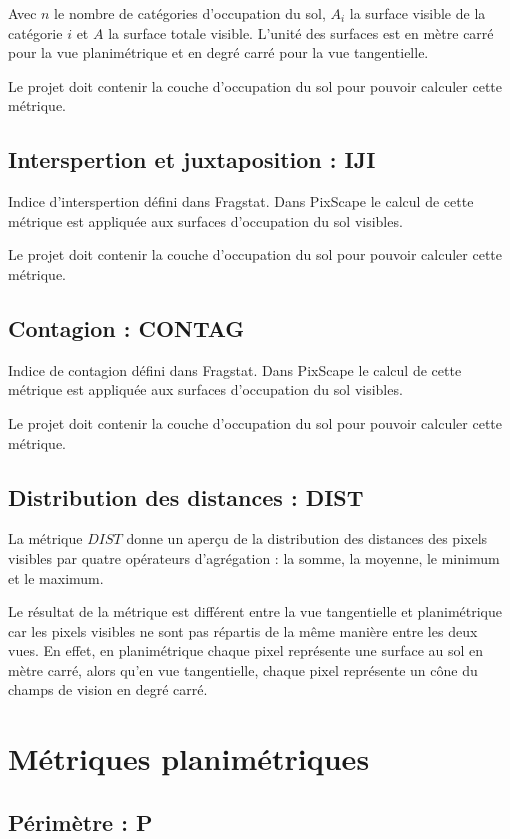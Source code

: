 \documentclass{report}
\begin{document}
Avec $n$ le nombre de catégories d'occupation du sol, $A_i$ la surface visible de la catégorie $i$ et $A$ la surface totale visible. L'unité des surfaces est en mètre carré pour la vue planimétrique et en degré carré pour la vue tangentielle.

Le projet doit contenir la couche d'occupation du sol pour pouvoir calculer cette métrique.

\subsection{Interspertion et juxtaposition : IJI}
Indice d'interspertion défini dans Fragstat. Dans PixScape le calcul de cette métrique est appliquée aux surfaces d'occupation du sol visibles.

Le projet doit contenir la couche d'occupation du sol pour pouvoir calculer cette métrique.

\subsection{Contagion : CONTAG}
Indice de contagion défini dans Fragstat. Dans PixScape le calcul de cette métrique est appliquée aux surfaces d'occupation du sol visibles.

Le projet doit contenir la couche d'occupation du sol pour pouvoir calculer cette métrique.

\subsection{Distribution des distances : DIST}

La métrique $DIST$ donne un aperçu de la distribution des distances des pixels visibles par quatre opérateurs d'agrégation : la somme, la moyenne, le minimum et le maximum.

Le résultat de la métrique est différent entre la vue tangentielle et planimétrique car les pixels visibles ne sont pas répartis de la même manière entre les deux vues. En effet, en planimétrique chaque pixel représente une surface au sol en mètre carré, alors qu'en vue tangentielle, chaque pixel représente un cône du champs de vision en degré carré.


\section{Métriques planimétriques}

\subsection{Périmètre : P}
\end{document}
